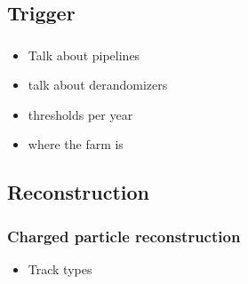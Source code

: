 \subsection{Trigger}
\subsubsection{\lone}


{\color{Red}
\begin{itemize}
\item Talk about pipelines
\item talk about derandomizers 
\item thresholds per year
\item where the farm is
\end{itemize}
}


\subsubsection{\hltone}
\subsubsection{\hlttwo}

\subsection{Reconstruction}
\subsubsection{Charged particle reconstruction}


{\color{Red}
\begin{itemize}
\item Track types
\end{itemize}
}

